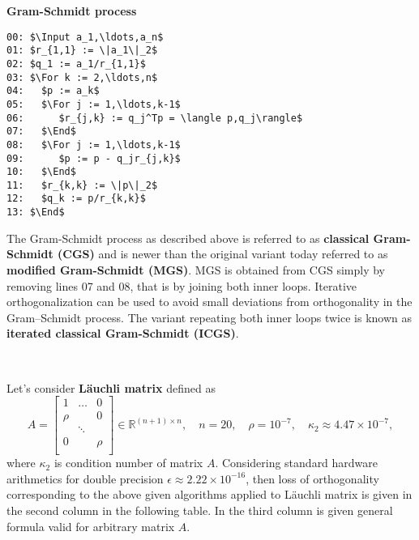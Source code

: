 \documentclass{report}
\newcommand{\Input}{\mathbf{input}\ }
\newcommand{\For}{\mathbf{for}\ }
\newcommand{\End}{\mathbf{end}\ }
\begin{document}

\noindent\textbf{Gram-Schmidt process}



\begin{lstlisting}
00: $\Input a_1,\ldots,a_n$
01: $r_{1,1} := \|a_1\|_2$
02: $q_1 := a_1/r_{1,1}$
03: $\For k := 2,\ldots,n$
04:   $p := a_k$
05:   $\For j := 1,\ldots,k-1$
06:      $r_{j,k} := q_j^Tp = \langle p,q_j\rangle$
07:   $\End$
08:   $\For j := 1,\ldots,k-1$
09:      $p := p - q_jr_{j,k}$
10:   $\End$
11:   $r_{k,k} := \|p\|_2$
12:   $q_k := p/r_{k,k}$
13: $\End$
\end{lstlisting}

\noindent The Gram-Schmidt process as described above is referred to
as \textbf{classical Gram-Schmidt (CGS)} and is newer than the
original variant today referred to as \textbf{modified Gram-Schmidt
  (MGS)}. MGS is obtained from CGS simply by removing lines 07 and 08,
that is by joining both inner loops. Iterative orthogonalization can
be used to avoid small deviations from orthogonality in the
Gram–Schmidt process. The variant repeating both inner loops twice is
known as \textbf{iterated classical Gram-Schmidt (ICGS)}.

~

%
\noindent Let's consider \textbf{L\"auchli matrix} defined as
%
$$
A = \left[\begin{array}{ccc}
    1    & \ldots & 0 \\
    \rho &        & 0 \\
    & \ddots      &   \\
    0    &        & \rho \\
  \end{array}\right] \in \mathbb{R}^{(n+1)\times n},\quad n=20,
  \quad\rho=10^{-7},\quad \kappa_2 \approx 4.47\times 10^{-7},
$$
%
where $\kappa_2$ is condition number of matrix $A$. Considering
standard hardware arithmetics for double precision $\epsilon \approx
2.22\times 10^{-16} $, then loss of orthogonality corresponding to the
above given algorithms applied to L\"auchli matrix is given in the
second column in the following table. In the third column is given
general formula valid for arbitrary matrix $A.$
\end{document}
